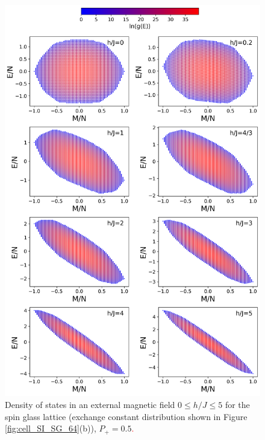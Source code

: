 \documentclass[preprint,12pt]{elsarticle}
\begin{document}
	\begin{figure}[H]
		\centering
		\includegraphics[width=1\linewidth]{pictures/HDOS_SG_64_J0.png}
		\caption{Density of states in an external magnetic field $0\leq h/J \leq 5$ for the spin glass lattice (exchange constant distribution shown in Figure \ref{fig:cell_SI_SG_64}(b)), $P_+ = 0.5$\textcolor{red}{.}}
		\label{fig:HDOS_glass}
	\end{figure}
	
\end{document}
